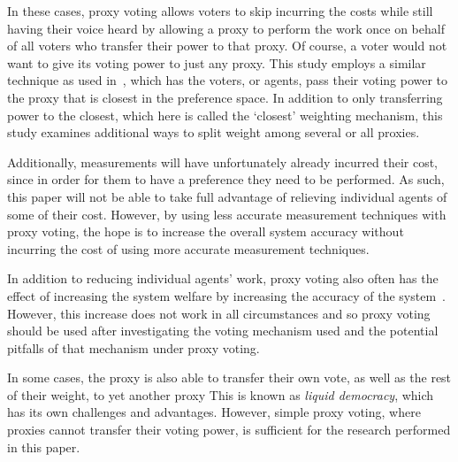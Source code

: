 In these cases, proxy voting allows voters to skip incurring the costs while
still having their voice heard by allowing a proxy to perform the work once on
behalf of all voters who transfer their power to that proxy.
Of course, a voter would not want to give its voting power to just any proxy.
This study employs a similar technique as used in~\cite{Cohensius2017}, which has the
voters, or agents, pass their voting power to the proxy that is closest in the
preference space.
In addition to only transferring power to the closest, which here is called the
`closest' weighting mechanism, this study examines additional ways to split weight
among several or all proxies.

Additionally, measurements will have unfortunately already incurred their cost, since in
order for them to have a preference they need to be performed.
As such, this paper will not be able to take full advantage of relieving individual
agents of some of their cost.
However, by using less accurate measurement techniques with proxy voting, the hope
is to increase the overall system accuracy without incurring the cost of using more
accurate measurement techniques.

In addition to reducing individual agents' work, proxy voting also often has
the effect of increasing the system welfare by increasing the accuracy of the
system~\cite[sec.~1.1]{Cohensius2017}.
However, this increase does not work in all circumstances and so proxy voting
should be used after investigating the voting mechanism used and the potential
pitfalls of that mechanism under proxy voting.

In some cases, the proxy is also able to transfer their own vote, as well as the rest of
their weight, to yet another proxy   
This is known as \textit{liquid democracy}, which has its own challenges and
advantages.
However, simple proxy voting, where proxies cannot transfer their voting power,
is sufficient for the research performed in this paper.

